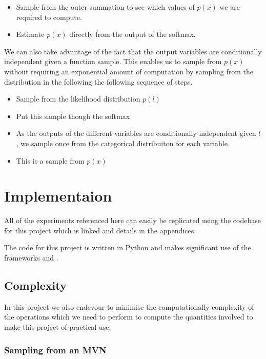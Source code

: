 \documentclass[12pt, a4paper]{report}
\theoremstyle{definition}
\begin{document}
\begin{itemize}
    \item Sample from the outer summation to see which values of $p(x)$ we are required to compute.
    \item Estimate $p(x)$ directly from the output of the softmax.
\end{itemize}

We can also take advantage of the fact that the output variables are conditionally independent given a function sample. This enables us to sample from $p(x)$ without requiring an exponential amount of computation by sampling from the distribution in the following the following sequence of steps.

\begin{itemize}
    \item Sample from the likelihood distribution $p(l)$
    \item Put this sample though the softmax
    \item As the outputs of the different variables are conditionally independent given $l$, we sample once from the categorical distribuiton for each variable.
    \item This is a sample from $p(x)$
\end{itemize}



\chapter{Implementaion}
\label{Chap6}

All of the experiments referenced here can easily be replicated using the codebase for this project which is linked and details in the appendices.

The code for this project is written in Python and makes significant use of the frameworks \cite[Pytorch]{NEURIPS2019_9015} and \cite[GPytorch]{gardner2018gpytorch}.





\section{Complexity}

In this project we also endevour to minimise the computationally complexity of the operations which we need to perform to compute the quantities involved to make this project of practical use.


\subsection{Sampling from an MVN}
\end{document}
